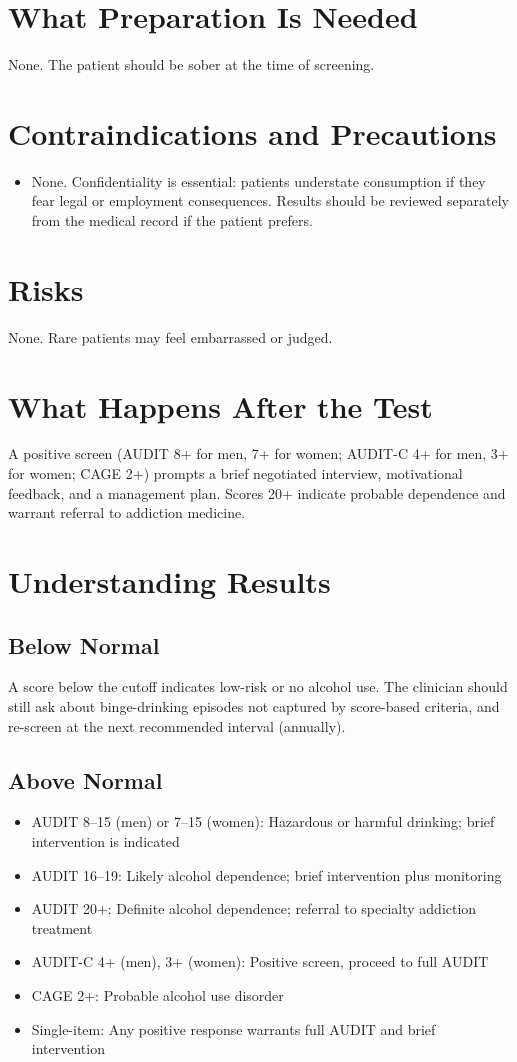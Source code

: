 \section*{What Preparation Is Needed}
None. The patient should be sober at the time of screening.

\section*{Contraindications and Precautions}
\begin{itemize}
  \item None. Confidentiality is essential: patients understate consumption if they fear legal or employment consequences. Results should be reviewed separately from the medical record if the patient prefers.
\end{itemize}
\section*{Risks}
None. Rare patients may feel embarrassed or judged.

\section*{What Happens After the Test}
A positive screen (AUDIT 8+ for men, 7+ for women; AUDIT-C 4+ for men, 3+ for women; CAGE 2+) prompts a brief negotiated interview, motivational feedback, and a management plan. Scores 20+ indicate probable dependence and warrant referral to addiction medicine.

\section*{Understanding Results}

\subsection*{Below Normal}
A score below the cutoff indicates low-risk or no alcohol use. The clinician should still ask about binge-drinking episodes not captured by score-based criteria, and re-screen at the next recommended interval (annually).

\subsection*{Above Normal}
\begin{itemize}
  \item AUDIT 8--15 (men) or 7--15 (women): Hazardous or harmful drinking; brief intervention is indicated
  \item AUDIT 16--19: Likely alcohol dependence; brief intervention plus monitoring
  \item AUDIT 20+: Definite alcohol dependence; referral to specialty addiction treatment
  \item AUDIT-C 4+ (men), 3+ (women): Positive screen, proceed to full AUDIT
  \item CAGE 2+: Probable alcohol use disorder
  \item Single-item: Any positive response warrants full AUDIT and brief intervention
\end{itemize}

